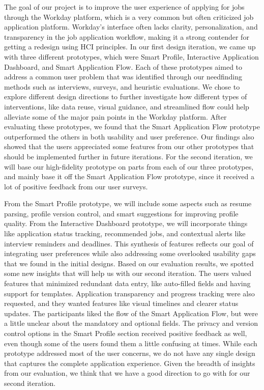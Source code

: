 \documentclass[
	letterpaper, %
]{jdf}
\begin{document}
\begin{sloppypar}
The goal of our project is to improve the user experience of applying for jobs through the Workday platform, which is a very common but often criticized job application platform. Workday’s interface often lacks clarity, personalization, and transparency in the job application workflow, making it a strong contender for getting a redesign using HCI principles. In our first design iteration, we came up with three different prototypes, which were Smart Profile, Interactive Application Dashboard, and Smart Application Flow. Each of these prototypes aimed to address a common user problem that was identified through our needfinding methods such as interviews, surveys, and heuristic evaluations. We chose to explore different design directions to further investigate how different types of interventions, like data reuse, visual guidance, and streamlined flow could help alleviate some of the major pain points in the Workday platform. After evaluating these prototypes, we found that the Smart Application Flow prototype outperformed the others in both usability and user preference. Our findings also showed that the users appreciated some features from our other prototypes that should be implemented further in future iterations. For the second iteration, we will base our high-fidelity prototype on parts from each of our three prototypes, and mainly base it off the Smart Application Flow prototype, since it received a lot of positive feedback from our user surveys. 

From the Smart Profile prototype, we will include some aspects such as resume parsing, profile version control, and smart suggestions for improving profile quality. From the Interactive Dashboard prototype, we will incorporate things like application status tracking, recommended jobs, and contextual alerts like interview reminders and deadlines. This synthesis of features reflects our goal of integrating user preferences while also addressing some overlooked usability gaps that we found in the initial designs. Based on our evaluation results, we spotted some new insights that will help us with our second iteration. The users valued features that minimized redundant data entry, like auto-filled fields and having support for templates. Application transparency and progress tracking were also requested, and they wanted features like visual timelines and clearer status updates. The participants liked the flow of the Smart Application Flow, but were a little unclear about the mandatory and optional fields. The privacy and version control options in the Smart Profile section received positive feedback as well, even though some of the users found them a little confusing at times. While each prototype addressed most of the user concerns, we do not have any single design that captures the complete application experience. Given the breadth of insights from our evaluation, we think that we have a good direction to go with for our second iteration.


\end{sloppypar}
\end{document}
